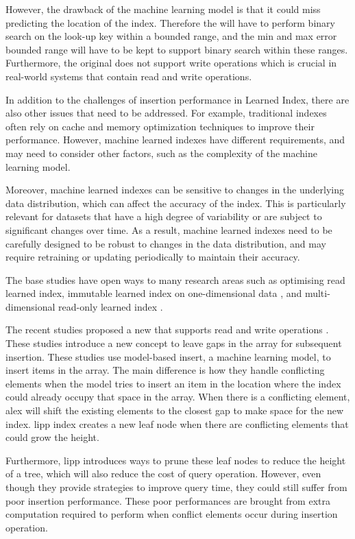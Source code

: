 However, the drawback of the machine learning model is that it could miss predicting the location of the index. Therefore the \learnindex will have to perform binary search on the look-up key within a bounded range, and the min and max error bounded range will have to be kept to support binary search within these ranges. Furthermore, the original \learnindex does not support write operations which is crucial in real-world systems that contain read and write operations.

In addition to the challenges of insertion performance in Learned Index, there are also other issues that need to be addressed. For example, traditional \btree indexes often rely on cache and memory optimization techniques to improve their performance. However, machine learned indexes have different requirements, and may need to consider other factors, such as the complexity of the machine learning model.

Moreover, machine learned indexes can be sensitive to changes in the underlying data distribution, which can affect the accuracy of the index. This is particularly relevant for datasets that have a high degree of variability or are subject to significant changes over time. As a result, machine learned indexes need to be carefully designed to be robust to changes in the data distribution, and may require retraining or updating periodically to maintain their accuracy.

The base \learnindex studies have open ways to many research areas such as optimising read learned index, immutable learned index on one-dimensional data \cite{ALEX, PGM, LIPP}, and multi-dimensional read-only learned index \cite{FloodLMD, Tsunami}.

The recent studies proposed a new \learnindex that supports read and write operations \cite{ALEX,fittingtree,LIPP,PGM}. These studies introduce a new concept to leave gaps in the array for subsequent insertion. These studies use model-based insert, a machine learning model, to insert items in the array. The main difference is how they handle conflicting elements when the model tries to insert an item in the location where the index could already occupy that space in the array. When there is a conflicting element, \acrfull{alex} will shift the existing elements to the closest gap to make space for the new index. \acrfull{lipp} index creates a new leaf node when there are conflicting elements that could grow the height.

Furthermore, \acrshort{lipp} introduces ways to prune these leaf nodes to reduce the height of a tree, which will also reduce the cost of query operation. However, even though they provide strategies to improve query time, they could still suffer from poor insertion performance. These poor performances are brought from extra computation required to perform when conflict elements occur during insertion operation. 

